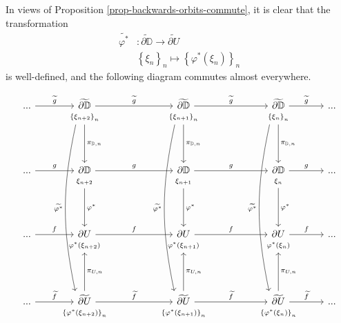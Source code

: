 \documentclass[11pt]{article}
\theoremstyle{definition}
\theoremstyle{remark}
\theoremstyle{plain}
\begin{document}
In views of Proposition \ref{prop-backwards-orbits-commute}, it is clear that the  transformation 
\begin{align*}
	\widetilde{\varphi^*}&\colon\widetilde{\partial\mathbb{D}}\longrightarrow\widetilde{\partial U}
\\
&\left\lbrace \xi_n\right\rbrace _n\mapsto 	\left\lbrace \varphi^*(\xi_n)\right\rbrace _n
\end{align*}
is well-defined, and the following diagram commutes almost everywhere. 

\[\begin{tikzcd}[row sep=-0.2em,/tikz/row 2/.style={row sep=4em},/tikz/row 4/.style={row sep=4em},/tikz/row 6/.style={row sep=4em}]
	...\arrow{r}{\widetilde{g}} &	\widetilde{\partial \mathbb{D}} \arrow{rr}{\widetilde{g}} & &	\widetilde{\partial \mathbb{D}} \arrow{rr}{\widetilde{g}} & &	\widetilde{\partial \mathbb{D}}\arrow{r}{\widetilde{g}} &...\\ 
	&	{\scriptstyle \left\lbrace \xi_{n+2}\right\rbrace _n}\arrow[ddddd, shift right=3, bend right=12, swap, "\widetilde{\varphi^*}"] \arrow{d}{\pi_{\mathbb{D},n}}& &{\scriptstyle \left\lbrace \xi_{n+1}\right\rbrace _n}\arrow[ddddd, shift right=3, bend right=12, swap, "\widetilde{\varphi^*}"] \arrow{d}{\pi_{\mathbb{D},n}}& &	{\scriptstyle \left\lbrace \xi_{n}\right\rbrace _n }\arrow[ddddd, shift right=3, bend right=12, swap, "\widetilde{\varphi^*}"]\arrow{d}{\pi_{\mathbb{D},n}} \\ ...\arrow{r}{g} &\partial \mathbb{D}\arrow{rr}{g}  &&
	\partial \mathbb{D} \arrow{rr}{g} && \partial \mathbb{D}\arrow{r}{g} &...\\ &{\scriptstyle \xi_{n+2} }\arrow{d}{\varphi^*} &&{\scriptstyle \xi_{n+1} }\arrow{d}{\varphi^*} &&{\scriptstyle \xi_n}\arrow{d}{\varphi^*} 
	\\ ...\arrow{r}{f} &\partial U \arrow{rr}{f}  &&
	\partial U\arrow{rr}{f}  && \partial U \arrow{r}{f} &...\\ &{\scriptstyle \varphi^*(\xi_{n+2}) }&&{\scriptstyle \varphi^*(\xi_{n+1}) }&&{\scriptstyle \varphi^*(\xi_n)}
	\\ ...\arrow{r}{\widetilde{f}} &\widetilde{\partial U} \arrow{rr}{\widetilde{f}}\arrow[swap]{u}{\pi_{U,n}}   &&
	\widetilde{\partial U}\arrow{rr}{\widetilde{f}}\arrow[swap]{u}{\pi_{U,n}}  && \widetilde{\partial U} \arrow{r}{\widetilde{f}}\arrow[swap]{u}{\pi_{U,n}}  &...\\ &{\scriptstyle \left\lbrace \varphi^*(\xi_{n+2})\right\rbrace _n }&&{\scriptstyle \left\lbrace \varphi^*(\xi_{n+1})\right\rbrace _n }&&{\scriptstyle \left\lbrace \varphi^*(\xi_n)\right\rbrace _n}
\end{tikzcd}
\]
\end{document}
